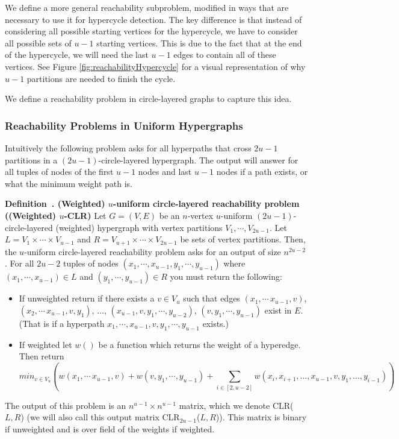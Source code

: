 \documentclass[11pt,letterpaper,pdftex]{article}
\newcounter{definition}
\newenvironment{definition}[1][]{\refstepcounter{definition}\par\medskip
   \noindent \textbf{Definition~\thedefinition. #1} \rmfamily}{\medskip}
\begin{document}
We define a more general reachability subproblem, modified in ways that are necessary to use it for hypercycle detection. 
The key difference is that instead of considering all possible starting vertices for the hypercycle, we have to consider all possible sets of $u-1$ starting vertices.
This is due to the fact that at the end of the hypercycle, we will need the last $u-1$ edges to contain all of these vertices. See Figure \ref{fig:reachabilityHypercycle} for a visual representation of why $u-1$ partitions are needed to finish the cycle. 

We define a reachability problem in circle-layered graphs to capture this idea.

\subsubsection{Reachability Problems in Uniform Hypergraphs}

\newcommand{\uCLR}{$u$-CLR}

Intuitively the following problem asks for all hyperpaths that cross $2u-1$ partitions in a $(2u-1)$-circle-layered hypergraph. The output will answer for all tuples of nodes of the first $u-1$ nodes and last $u-1$ nodes if a path exists, or what the minimum weight path is. 

\begin{definition}[(Weighted) $u$-uniform circle-layered reachability problem ((Weighted) \uCLR)] \label{def: u-CLR}
Let $G=(V,E)$ be an $n$-vertex $u$-uniform $(2u-1)$-circle-layered (weighted) hypergraph with vertex partitions $V_1, \cdots, V_{2u-1}$. 
Let $L=V_1 \times \cdots \times V_{u-1}$ and $R=V_{u+1} \times \cdots \times V_{2u-1}$ be sets of vertex partitions.
Then, the $u$-uniform circle-layered reachability problem asks for an output of size $n^{2u-2}$. 
For all $2u-2$ tuples of nodes $(x_1, \cdots, x_{u-1}, y_1, \cdots, y_{u-1})$  where $(x_1, \cdots, x_{u-1}) \in L$ and  $(y_1, \cdots, y_{u-1}) \in R$ you must return the following:
\begin{itemize}
    \item If unweighted return if there exists a $v \in V_{u}$ 
such that edges $(x_1, \cdots \, x_{u-1},v)$, $(x_2, \cdots \, x_{u-1},v,y_1)$,  $\ldots$, $(x_{u-1},v, y_1, \cdots, y_{u-2})$, $(v, y_1, \cdots, y_{u-1})$ exist  in $E$. (That is if a hyperpath $x_1, \cdots, x_{u-1}, v, y_1, \cdots, y_{u-1}$ exists.)  
    \item If weighted let $w()$ be a function which returns the weight of a hyperedge. Then return 
    $$ min_{v\in V_{u}}  \left( w(x_1, \cdots \, x_{u-1},v)+ w(v, y_1, \cdots, y_{u-1}) + \sum_{i\in [2,u-2]} w(x_i,x_{i+1},\ldots,x_{u-1}, v, y_1, \ldots, y_{i-1}) \right) $$
\end{itemize}
  
The output of this problem is an $n^{u-1} \times n^{u-1}$ matrix, which we denote CLR($L,R$) (we will also call this output matrix CLR$_{2u-1}$($L,R$)). This matrix is binary if unweighted and is over field of the weights if weighted. 
\end{definition}
\end{document}
